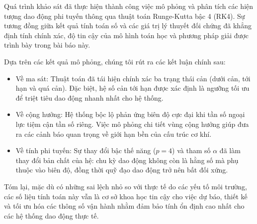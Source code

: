 Quá trình khảo sát đã thực hiện thành công việc mô phỏng và phân tích các hiện tượng dao động phi tuyến thông qua thuật toán Runge-Kutta bậc 4 (RK4). Sự tương đồng giữa kết quả tính toán số và các giá trị lý thuyết đối chứng đã khẳng định tính chính xác, độ tin cậy của mô hình toán học và phương pháp giải được trình bày trong bài báo này.

Dựa trên các kết quả mô phỏng, chúng tôi rút ra các kết luận chính sau:
\begin{itemize}
    \item Về ma sát: Thuật toán đã tái hiện chính xác ba trạng thái cản (dưới cản, tới hạn và quá cản). Đặc biệt, hệ số cản tới hạn được xác định là ngưỡng tối ưu để triệt tiêu dao động nhanh nhất cho hệ thống.
    \item Về cộng hưởng: Hệ thống bộc lộ phản ứng biên độ cực đại khi tần số ngoại lực tiệm cận tần số riêng. Việc mô phỏng chi tiết vùng cộng hưởng giúp đưa ra các cảnh báo quan trọng về giới hạn bền của cấu trúc cơ khí.
    \item Về tính phi tuyến: Sự thay đổi bậc thế năng ($p=4$) và tham số $\alpha$ đã làm thay đổi bản chất của hệ: chu kỳ dao động không còn là hằng số mà phụ thuộc vào biên độ, đồng thời quỹ đạo dao động trở nên bất đối xứng.
\end{itemize}

Tóm lại, mặc dù có những sai lệch nhỏ so với thực tế do các yếu tố môi trường, các số liệu tính toán này vẫn là cơ sở khoa học tin cậy cho việc dự báo, thiết kế và tối ưu hóa các thông số vận hành nhằm đảm bảo tính ổn định cao nhất cho các hệ thống dao động thực tế.
